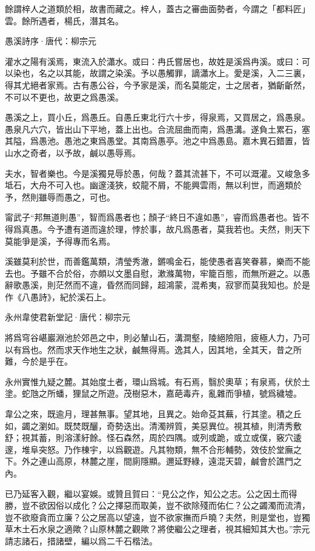 \documentclass[12pt,a4paper]{ctexbook}
\begin{document}
餘謂梓人之道類於相，故書而藏之。梓人，蓋古之審曲面勢者，今謂之「都料匠」雲。餘所遇者，楊氏，潛其名。\par
愚溪詩序·唐代：柳宗元 \par
灌水之陽有溪焉，東流入於瀟水。或曰：冉氏嘗居也，故姓是溪爲冉溪。或曰：可以染也，名之以其能，故謂之染溪。予以愚觸罪，謫瀟水上。愛是溪，入二三裏，得其尤絕者家焉。古有愚公谷，今予家是溪，而名莫能定，士之居者，猶齗齗然，不可以不更也，故更之爲愚溪。\par
愚溪之上，買小丘，爲愚丘。自愚丘東北行六十步，得泉焉，又買居之，爲愚泉。愚泉凡六穴，皆出山下平地，蓋上出也。合流屈曲而南，爲愚溝。遂負土累石，塞其隘，爲愚池。愚池之東爲愚堂。其南爲愚亭。池之中爲愚島。嘉木異石錯置，皆山水之奇者，以予故，鹹以愚辱焉。\par
夫水，智者樂也。今是溪獨見辱於愚，何哉？蓋其流甚下，不可以溉灌。又峻急多坻石，大舟不可入也。幽邃淺狹，蛟龍不屑，不能興雲雨，無以利世，而適類於予，然則雖辱而愚之，可也。\par
甯武子“邦無道則愚”，智而爲愚者也；顏子“終日不違如愚”，睿而爲愚者也。皆不得爲真愚。今予遭有道而違於理，悖於事，故凡爲愚者，莫我若也。夫然，則天下莫能爭是溪，予得專而名焉。\par
溪雖莫利於世，而善鑑萬類，清瑩秀澈，鏘鳴金石，能使愚者喜笑眷慕，樂而不能去也。予雖不合於俗，亦頗以文墨自慰，漱滌萬物，牢籠百態，而無所避之。以愚辭歌愚溪，則茫然而不違，昏然而同歸，超鴻蒙，混希夷，寂寥而莫我知也。於是作《八愚詩》，紀於溪石上。\par
永州韋使君新堂記·唐代：柳宗元 \par
將爲穹谷嵁巖淵池於郊邑之中，則必輦山石，溝澗壑，陵絕險阻，疲極人力，乃可以有爲也。然而求天作地生之狀，鹹無得焉。逸其人，因其地，全其天，昔之所難，今於是乎在。\par
永州實惟九疑之麓。其始度土者，環山爲城。有石焉，翳於奧草；有泉焉，伏於土塗。蛇虺之所蟠，狸鼠之所遊。茂樹惡木，嘉葩毒卉，亂雜而爭植，號爲穢墟。\par
韋公之來，既逾月，理甚無事。望其地，且異之。始命芟其蕪，行其塗。積之丘如，蠲之瀏如。既焚既釃，奇勢迭出。清濁辨質，美惡異位。視其植，則清秀敷舒；視其蓄，則溶漾紆餘。怪石森然，周於四隅。或列或跪，或立或僕，竅穴逶邃，堆阜突怒。乃作棟宇，以爲觀遊。凡其物類，無不合形輔勢，效伎於堂廡之下。外之連山高原，林麓之崖，間廁隱顯。邇延野綠，遠混天碧，鹹會於譙門之內。\par
已乃延客入觀，繼以宴娛。或贊且賀曰：“見公之作，知公之志。公之因土而得勝，豈不欲因俗以成化？公之擇惡而取美，豈不欲除殘而佑仁？公之蠲濁而流清，豈不欲廢貪而立廉？公之居高以望遠，豈不欲家撫而戶曉？夫然，則是堂也，豈獨草木土石水泉之適歟？山原林麓之觀歟？將使繼公之理者，視其細知其大也。”宗元請志諸石，措諸壁，編以爲二千石楷法。\par
\end{document}
